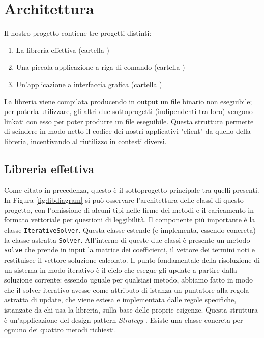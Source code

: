 \section{Architettura}

Il nostro progetto contiene tre progetti distinti:

\begin{enumerate}
	\item La libreria effettiva (cartella )
	\item Una piccola applicazione a riga di comando (cartella )
	\item Un'applicazione a interfaccia grafica (cartella )
\end{enumerate}

La libreria viene compilata producendo in output un file binario non eseguibile; per poterla utilizzare, gli altri due sottoprogetti (indipendenti tra loro) vengono linkati con esso per poter produrre un file eseguibile. Questa struttura permette di scindere in modo netto il codice dei nostri applicativi "client" da quello della libreria, incentivando al riutilizzo in contesti diversi.

\subsection{Libreria effettiva}
Come citato in precedenza, questo è il sottoprogetto principale tra quelli presenti. In Figura \ref{fig:libdiagram} si può osservare l'architettura delle classi di questo progetto, con l'omissione di alcuni tipi nelle firme dei metodi e il caricamento in formato vettoriale per questioni di leggibilità. Il componente più importante è la classe \texttt{IterativeSolver}. Questa classe estende (e implementa, essendo concreta) la classe astratta \texttt{Solver}. All'interno di queste due classi  è presente un metodo \texttt{solve} che prende in input la matrice dei coefficienti, il vettore dei termini noti e restituisce il vettore soluzione calcolato. Il punto fondamentale della risoluzione di un sistema in modo iterativo è il ciclo che esegue gli update a partire dalla soluzione corrente: essendo uguale per qualsiasi metodo, abbiamo fatto in modo che il solver iterativo avesse come attributo di istanza un puntatore alla regola astratta di update, che viene estesa e implementata dalle regole specifiche, istanzate da chi usa la libreria, sulla base delle proprie esigenze. Questa struttura è un'applicazione del design pattern \textit{Strategy} \cite{Strategy}. Esiste una classe concreta per ognuno dei quattro metodi richiesti.

